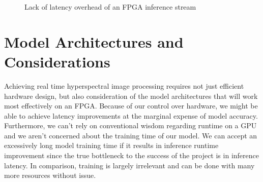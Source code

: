 \documentclass[psamsfonts]{amsart}
\newcommand{\mycomment}[1]{}
\theoremstyle{definition}
\theoremstyle{remark}
\numberwithin{equation}{section}
\begin{document}
\begin{figure}[ht]
  \centering
  \caption{Lack of latency overhead of an FPGA inference stream}
  \label{fig:fpgadiagram}
\end{figure}

\section{Model Architectures and Considerations}
Achieving real time hyperspectral image processing requires not just efficient hardware design, but also consideration of the model architectures that will work most effectively on an FPGA. Because of our control over hardware\mycomment{Note: not sure what I wanted to say here and usage of pipelining and fixed data types},
we might be able to achieve latency improvements at the marginal expense of model accuracy. Furthermore, we can't rely on conventional wisdom regarding runtime on a GPU and we aren't concerned about the training time of our model. We can accept an excessively long model training time if it results in inference runtime improvement since the true bottleneck to the success of the project is in inference latency. In comparison, training is largely irrelevant and can be done with many more resources without issue.
\end{document}
